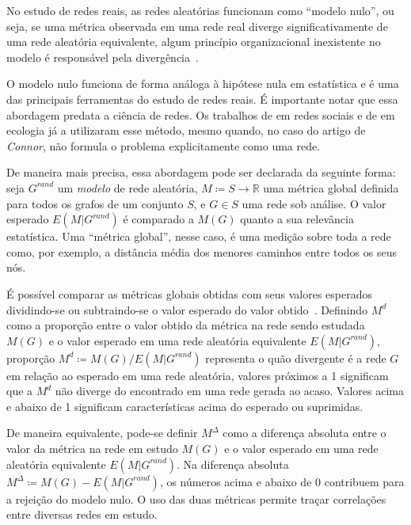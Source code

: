 \documentclass[12pt,a4paper]{article}
\theoremstyle{hypo}
\newcommand{\R}{\mathbb{R}} %
\newcommand{\defn}{\coloneqq} %
\begin{document}
No estudo de redes reais, as redes aleatórias funcionam como \enquote{modelo nulo}, ou seja, se uma métrica observada em uma rede real diverge significativamente de uma rede aleatória equivalente, algum princípio organizacional inexistente no modelo é responsável pela divergência~\cite{Zweig2016-rb}.

O modelo nulo funciona de forma análoga à hipótese nula em estatística e é uma das principais ferramentas do estudo de redes reais. É importante notar que essa abordagem predata a ciência de redes. Os trabalhos de  em redes sociais e de  em ecologia já a utilizaram esse método, mesmo quando, no caso do artigo de \textit{Connor}, não formula o problema explicitamente como uma rede.

De maneira mais precisa, essa abordagem pode ser declarada da seguinte forma: seja $G^\textit{rand}$ um \textit{modelo} de rede aleatória, $M \defn S \to \R$ uma métrica global definida para todos os grafos de um conjunto $S$, e $G \in S$ uma rede sob análise. O valor esperado $E(M|G^\textit{rand})$ é comparado a $M(G)$ quanto a sua relevância estatística. Uma \enquote{métrica global}, nesse caso, é uma medição sobre toda a rede como, por exemplo, a distância média dos menores caminhos entre todos os seus nós.

É possível comparar as métricas globais obtidas com seus valores esperados dividindo-se ou subtraindo-se o valor esperado do valor obtido~\cite{Zweig2016-rb}. Definindo $M^d$ como a proporção entre o valor obtido da métrica na rede sendo estudada $M(G)$ e o valor esperado em uma rede aleatória equivalente $E(M|G^\textit{rand})$, proporção $M^d \defn M(G) / E(M|G^\textit{rand})$ representa o quão divergente é a rede $G$ em relação ao esperado em uma rede aleatória, valores próximos a 1 significam que a $M^d$ não diverge do encontrado em uma rede gerada ao acaso. Valores acima e abaixo de 1 significam características acima do esperado ou suprimidas.

De maneira equivalente, pode-se definir $M^\Delta$ como a diferença absoluta entre o valor da métrica na rede em estudo $M(G)$ e o valor esperado em uma rede aleatória equivalente $E(M|G^\textit{rand})$. Na diferença absoluta $M^\Delta \defn M(G) - E(M|G^\textit{rand})$, os números acima e abaixo de 0 contribuem para a rejeição do modelo nulo. O uso das duas métricas permite traçar correlações entre diversas redes em estudo.
\end{document}
